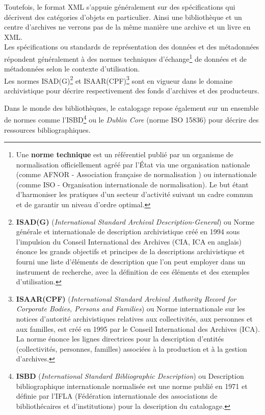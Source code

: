 Toutefois, le format XML s'appuie généralement sur des spécifications qui décrivent des catégories d'objets en particulier. Ainsi une bibliothèque et un centre d'archives ne verrons pas de la même manière une archive et un livre en XML.\\

Les spécifications ou standards de représentation des données et des métadonnées répondent généralement à des normes techniques d'échange\footnote{Une \textbf{norme technique} est un référentiel publié par un organisme de normalisation officiellement agréé par l'État via une organisation nationale (comme AFNOR - Association française de normalisation ) ou internationale (comme ISO - Organisation internationale de normalisation). Le but étant d'harmoniser les pratiques d'un secteur d'activité suivant un cadre commun et de garantir un niveau d'ordre optimal.} de données et de métadonnées selon le contexte d'utilisation.\\

Les normes ISAD(G)\footnote{\textbf{ISAD(G)} (\textit{International Standard Archival Description-General}) ou Norme générale et internationale de description archivistique créé en 1994 sous l'impulsion du Conseil International des Archives (CIA, ICA en anglais) énonce les grands objectifs et principes de la descriptions archivistique et fourni une liste d'éléments de description que l'on peut employer dans un instrument de recherche, avec la définition de ces éléments et des exemples d'utilisation.} et ISAAR(CPF)\footnote{\textbf{ISAAR(CPF)} (\textit{International Standard Archival Authority Record for Corporate Bodies, Persons and Families}) ou Norme internationale sur les notices d'autorité archivistiques relatives aux collectivités, aux personnes et aux familles, est créé en 1995 par le Conseil International des Archives (ICA). La norme énonce les lignes directrices pour la description d'entités (collectivités, personnes, familles) associées à la production et à la gestion d'archives.} sont en vigueur dans le domaine archivistique pour décrire respectivement des fonds d'archives et des producteurs.

Dans le monde des bibliothèques, le catalogage repose également sur un ensemble de normes comme l'ISBD\footnote{\textbf{ISBD} (\textit{International Standard Bibliographic Description}) ou Description bibliographique internationale normalisée est une norme publié en 1971 et définie par l'IFLA (Fédération internationale des associations de bibliothécaires et d'institutions) pour la description du catalogage.} ou le \textit{Dublin Core} (norme ISO 15836) pour décrire des ressources bibliographiques.

